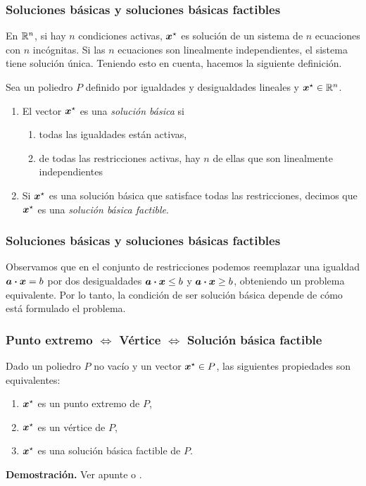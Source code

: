 \documentclass[aspectratio=169,12pt,spanish]{beamer}
\begin{document}
\begin{frame}
\frametitle{Soluciones básicas y soluciones básicas factibles}

En $\mathbb{R}^n$, si hay $n$ condiciones activas, $\bm{x}^\star$ es solución de un sistema de $n$ ecuaciones con $n$ incógnitas. Si las $n$ ecuaciones son linealmente independientes, el sistema tiene solución única. Teniendo esto en cuenta, hacemos la siguiente definición.

\begin{definition}
Sea un poliedro $P$ definido por igualdades y desigualdades lineales y $\bm{x}^\star \in \mathbb{R}^n$.
\begin{enumerate}
\item El vector $\bm{x}^\star$ es una \emph{solución básica} si
\begin{enumerate}
\item todas las igualdades están activas,
\item de todas las restricciones activas, hay $n$ de ellas que son linealmente independientes
\end{enumerate}
\item Si $\bm{x}^\star$ es una solución básica que satisface todas las restricciones, decimos que $\bm{x}^\star$ es una \emph{solución básica factible}.
\end{enumerate}
\end{definition}

\end{frame}


\begin{frame}
\frametitle{Soluciones básicas y soluciones básicas factibles}

Observamos que en el conjunto de restricciones podemos reemplazar una igualdad $\bm{a} \boldsymbol{\cdot} \bm{x} = b$ por dos desigualdades $\bm{a} \boldsymbol{\cdot} \bm{x} \le b$ y $\bm{a} \boldsymbol{\cdot} \bm{x} \ge b$, obteniendo un problema equivalente. Por lo tanto, la condición de ser solución básica depende de cómo está formulado el problema.

\end{frame}


\begin{frame}
\frametitle{Punto extremo $\iff$ Vértice $\iff$ Solución básica factible}

\begin{theorem}
Dado un poliedro $P$ no vacío y un vector $\bm{x}^\star \in P$, las siguientes propiedades son equivalentes:
\begin{enumerate}
\item $\bm{x}^\star$ es un punto extremo de $P$,
\item $\bm{x}^\star$ es un vértice de $P$,
\item $\bm{x}^\star$ es una solución básica factible de $P$.
\end{enumerate}
\end{theorem}

\textbf{Demostración.} Ver apunte o \cite[Teorema 2.3]{Bertsimas1997}.
\end{frame}
\end{document}
